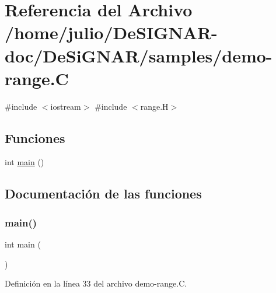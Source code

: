 \hypertarget{demo-range_8_c}{}\section{Referencia del Archivo /home/julio/\+De\+S\+I\+G\+N\+A\+R-\/doc/\+De\+Si\+G\+N\+A\+R/samples/demo-\/range.C}
\label{demo-range_8_c}
{\ttfamily \#include $<$iostream$>$}\newline
{\ttfamily \#include $<$range.\+H$>$}\newline
\subsection*{Funciones}
\begin{DoxyCompactItemize}
\item 
int \hyperlink{demo-range_8_c_ae66f6b31b5ad750f1fe042a706a4e3d4}{main} ()
\end{DoxyCompactItemize}


\subsection{Documentación de las funciones}
\mbox{\label{demo-range_8_c_ae66f6b31b5ad750f1fe042a706a4e3d4}} 
\subsubsection{\texorpdfstring{main()}{main()}}
{\footnotesize\ttfamily int main (\begin{DoxyParamCaption}{ }\end{DoxyParamCaption})}



Definición en la línea 33 del archivo demo-\/range.\+C.


